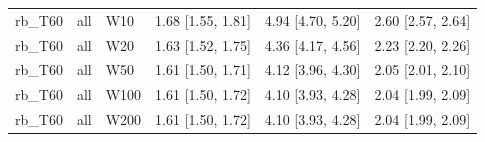 {\begin{longtable}{llllll}
rb\_T60 & all & W10 & 1.68 [1.55, 1.81] & 4.94 [4.70, 5.20] & 2.60 [2.57, 2.64] \\
rb\_T60 & all & W20 & 1.63 [1.52, 1.75] & 4.36 [4.17, 4.56] & 2.23 [2.20, 2.26] \\
rb\_T60 & all & W50 & 1.61 [1.50, 1.71] & 4.12 [3.96, 4.30] & 2.05 [2.01, 2.10] \\
rb\_T60 & all & W100 & 1.61 [1.50, 1.72] & 4.10 [3.93, 4.28] & 2.04 [1.99, 2.09] \\
rb\_T60 & all & W200 & 1.61 [1.50, 1.72] & 4.10 [3.93, 4.28] & 2.04 [1.99, 2.09] \\
\bottomrule
\end{longtable}
}
